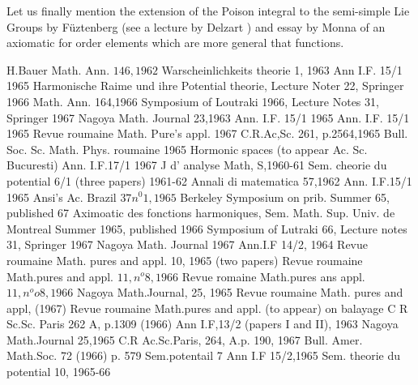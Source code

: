 Let us finally mention the extension of the Poison integral to the
semi-simple Lie Groups by F\"uztenberg \cite{37bis} (see a lecture by
Delzart \cite{35bis}) and essay  by Monna \cite{62bis} of an axiomatic for
order elements which are more general that functions. 

\begin{thebibliography}{99}
 {H.Bauer} Math. Ann. $146,1962$\pageoriginale
{} Warscheinlichkeits theorie 1, 1963
 Ann I.F. 15/1 1965
 Harmonische Raime und ihre Potential theorie,
  Lecture Noter 22, Springer 1966 
  Math. Ann. 164,1966
 Symposium of Loutraki 1966, Lecture Notes 31,
  Springer 1967 
 Nagoya Math. Journal 23,1963
 Ann. I.F. 15/1 1965
 Ann. I.F. 15/1 1965
 Revue roumaine Math. Pure's appl. 1967
 C.R.Ac,Sc. 261, p.2564,1965
 Bull. Soc. Sc. Math. Phys. roumaine 1965
 Hormonic spaces (to appear Ac. Sc. Bucuresti)
  Ann. I.F.17/1 1967
  J d' analyse Math, S,1960-61
 Sem. cheorie du potential 6/1 (three papers) 1961-62
 Annali di matematica 57,1962
 Ann. I.F.15/1 1965
 Ansi's Ac. Brazil $37 n^0 1,1965$
 Berkeley Symposium on prib. Summer 65, published 67
 Aximoatic des fonctions harmoniques,
  Sem. Math. Sup. Univ. de Montreal Summer 1965, published 1966 \pageoriginale
{} Symposium of Lutraki 66, Lecture  notes 31, Springer 1967
 Nagoya Math. Journal 1967
 Ann.I.F 14/2, 1964
 Revue roumaine Math. pures and
  appl. 10, 1965 (two papers) 
 Revue roumaine Math.pures and appl. $11,n^o 8, 1966$ 
 Revue romaine Math.pures ans appl. $11, n^o o 8, 1966$
 Nagoya Math.Journal, 25, 1965
 Revue roumaine Math. pures and appl, (1967)
 Revue roumaine Math.pures and appl. (to appear) on balayage
 C R  Sc.Sc. Paris 262 A, p.1309 (1966)
 Ann I.F,13/2 (papers I and
  II), 1963 
 Nagoya Math.Journal 25,1965
 C.R Ac.Sc.Paris, 264, A.p. 190, 1967
 Bull. Amer. Math.Soc. 72 (1966) p. 579
 Sem.potentail 7
 Ann I.F 15/2,1965
Sem. theorie du potential 10, 1965-66

\end{thebibliography}
